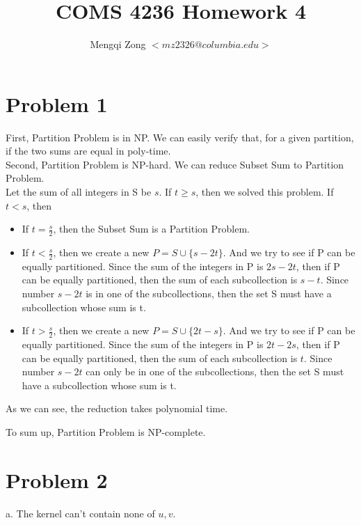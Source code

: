\documentclass[12pt]{article}
\title{COMS 4236 Homework 4}
\author{Mengqi Zong $<mz2326@columbia.edu>$}
\begin{document}
\maketitle

\setlength{\parindent}{0in}

\section*{Problem 1}

First, Partition Problem is in NP. We can easily verify that, for a given
partition, if the two sums are equal in poly-time. \\

Second, Partition Problem is NP-hard. We can reduce Subset Sum to
Partition Problem. \\

Let the sum of all integers in S be $s$. If $t \ge s$, then we solved
this problem. If $t < s$, then

\begin{itemize}
\item If $t = \frac {s}{2}$, then the Subset Sum is a Partition
  Problem.
\item If $t < \frac {s}{2}$, then we create a new $P = S \cup \{ s-2t
  \}$. And we try to see if P can be equally partitioned. Since the
  sum of the integers in P is $2s-2t$, then if P can be equally
  partitioned, then the sum of each subcollection is $s -
  t$. Since number $s-2t$ is in one of the subcollections, then the
  set S must have a subcollection whose sum is t.
\item If $t > \frac {s}{2}$, then we create a new $P = S \cup \{ 2t-s
  \}$. And we try to see if P can be equally partitioned. Since the
  sum of the integers in P is $2t-2s$, then if P can be equally
  partitioned, then the sum of each subcollection is $t$. Since number
  $s-2t$ can only be in one of the subcollections, then the set S must
  have a subcollection whose sum is t.
\end{itemize}

As we can see, the reduction takes polynomial time.

To sum up, Partition Problem is NP-complete. \\

\section*{Problem 2}

a. The kernel can't contain none of $u, v$. \\
\end{document}
